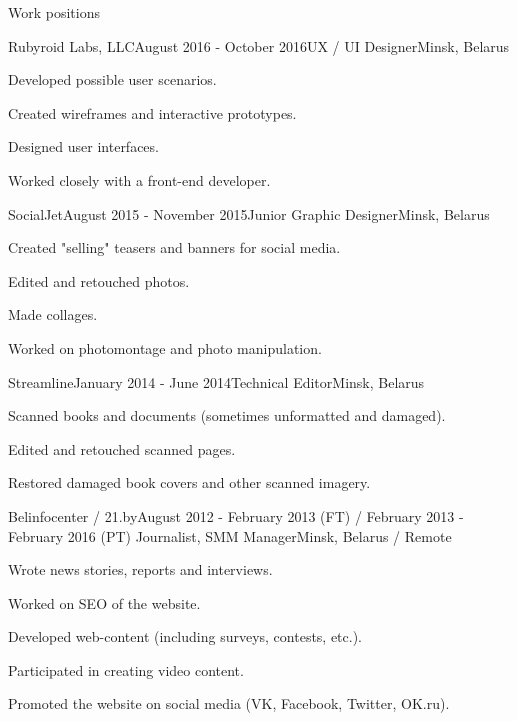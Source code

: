 \documentclass{resume} %
\begin{document}
\begin{rSection}{Work positions}

\begin{rSubsection}{Rubyroid Labs, LLC}{August 2016 - October 2016}{UX / UI Designer}{Minsk, Belarus}
\item Developed possible user scenarios.
\item Created wireframes and interactive prototypes.
\item Designed user interfaces.
\item Worked closely with a front-end developer.
\end{rSubsection}

\begin{rSubsection}{SocialJet}{August 2015 - November 2015}{Junior Graphic Designer}{Minsk, Belarus}
\item Created "selling" teasers and banners for social media.
\item Edited and retouched photos.
\item Made collages.
\item Worked on photomontage and photo manipulation.
\end{rSubsection}


\begin{rSubsection}{Streamline}{January 2014 - June 2014}{Technical Editor}{Minsk, Belarus}
\item Scanned books and documents (sometimes unformatted and damaged).
\item Edited and retouched scanned pages.
\item Restored damaged book covers and other scanned imagery. 
\end{rSubsection}

\begin{rSubsection}{Belinfocenter / 21.by}{August 2012 - February 2013 (FT) / February 2013 - February 2016 (PT) }{Journalist, SMM Manager}{Minsk, Belarus / Remote}
\item Wrote news stories, reports and interviews.
\item Worked on SEO of the website. 
\item Developed web-content (including surveys, contests, etc.).
\item Participated in creating video content.
\item Promoted the website on social media (VK, Facebook, Twitter, OK.ru).

\end{rSubsection}

\end{rSection}
\end{document}
